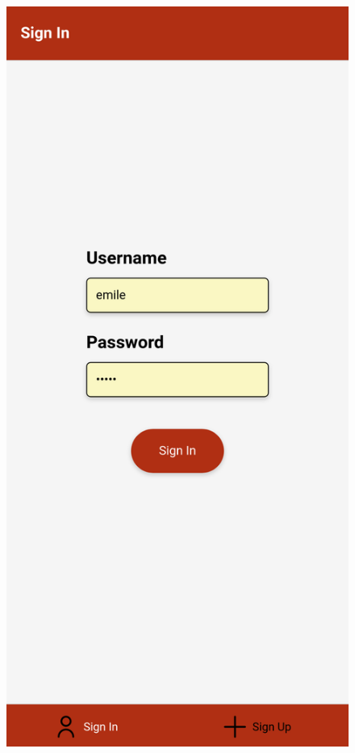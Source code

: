 \documentclass[12pt]{article}
\begin{document}
        \begin{minipage}[t]{0.45\textwidth}
            \begin{figure}[H]
                \centering
                \includegraphics[scale=0.2]{images/signIn}

\end{figure}
\end{minipage}
\end{document}
